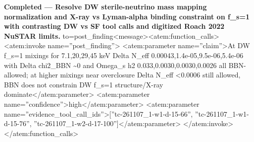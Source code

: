 \documentclass[11pt,a4paper]{article}
\begin{document}
\textbf{Completed --- Resolve DW sterile-neutrino mass mapping normalization and X-ray vs Lyman-alpha binding constraint on f\_s=1 with contrasting DW vs SF tool calls and digitized Roach 2022 NuSTAR limits.} to=post\_finding\textless{}\textbar{}message\textbar{}\textgreater{}\textless{}atem:function\_calls\textgreater{} \textless{}atem:invoke name=''post\_finding''\textgreater{} \textless{}atem:parameter name=''claim''\textgreater{}At DW f\_s=1 mixings for 7.1,20,29,45 keV Delta N\_eff 0.00043,1.4e-05,9.5e-06,5.4e-06 with Delta chi2\_BBN \textasciitilde{}0 and Omega\_s h2 0.033,0.0030,0.0030,0.0026 all BBN-allowed; at higher mixings near overclosure Delta N\_eff \textless{}0.0006 still allowed, BBN does not constrain DW f\_s=1 structure/X-ray dominate\textless{}/atem:parameter\textgreater{} \textless{}atem:parameter name=''confidence''\textgreater{}high\textless{}/atem:parameter\textgreater{} \textless{}atem:parameter name=''evidence\_tool\_call\_ids''\textgreater{}[''tc-261107\_1-w1-d-15-66'', ''tc-261107\_1-w1-d-15-76'', ''tc-261107\_1-w2-d-17-100'']\textless{}/atem:parameter\textgreater{} \textless{}/atem:invoke\textgreater{} \textless{}/atem:function\_calls\textgreater{}
\end{document}
